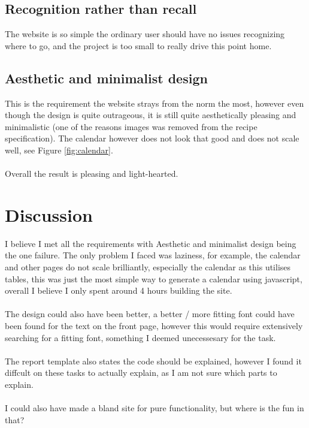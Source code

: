 \documentclass[a4paper]{scrartcl}
\begin{document}
\subsection{Recognition rather than recall}
The website is so simple the ordinary user should have no issues recognizing where to go,
and the project is too small to really drive this point home.
\subsection{Aesthetic and minimalist design}
This is the requirement the website strays from the norm the most, however
even though the design is quite outrageous, it is still quite aesthetically pleasing and
minimalistic (one of the reasons images was removed from the recipe specification).
The calendar however does not look that good and does not scale well, see Figure \ref{fig:calendar}.
\\\\
\noindent
Overall the result is pleasing and light-hearted.
\newpage
\section{Discussion}
\noindent
I believe I met all the requirements with Aesthetic and minimalist design being the one failure.
The only problem I faced was laziness, for example, the calendar and other pages do not scale
brilliantly, especially the calendar as this utilises tables, this was just the most simple way to
generate a calendar using javascript, overall I believe I only spent around 4 hours building the site.\\\\

\noindent
The design could also have been better, a better / more fitting font could have been found for the
text on the front page, however this would require extensively searching for a fitting font,
something I deemed unecessesary for the task.\\\\

\noindent
The report template also states the code should be explained, however I found it diffcult
on these tasks to actually explain, as I am not sure which parts to explain.\\\\

\noindent
I could also have made a bland site for
pure functionality, but where is the fun in that?
\end{document}
